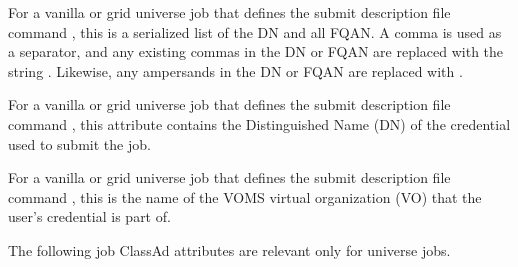 \begin{description}
\item[\AdAttr{X509UserProxyFQAN}:]   
For a vanilla or grid universe job that defines the submit description
file command , 
this is a serialized list of the DN and all FQAN.
A comma is used as a separator,
and any existing commas in the DN or FQAN are replaced with the string
.
Likewise, any ampersands in the DN or FQAN are replaced with
.

\item[\AdAttr{X509UserProxySubject}:]   
For a vanilla or grid universe job that defines the submit description
file command , 
this attribute contains the Distinguished Name (DN) of the credential
used to submit the job.

\item[\AdAttr{X509UserProxyVOName}:]   
For a vanilla or grid universe job that defines the submit description
file command , 
this is the name of the VOMS virtual organization (VO) that 
the user's credential is part of. 

\end{description}

The following job ClassAd attributes are relevant only for
 universe jobs.

